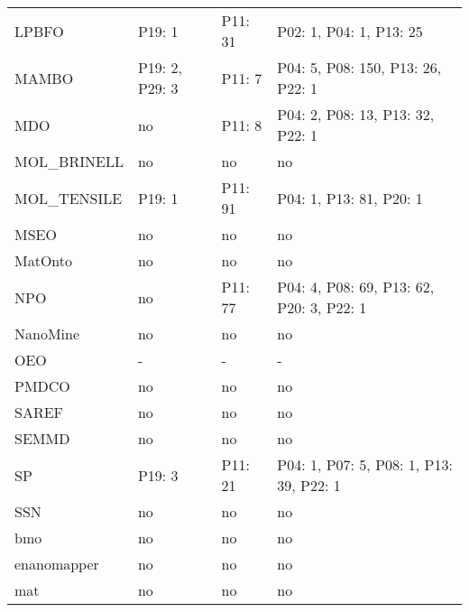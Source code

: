 \begin{tabular}{m{5cm}m{3cm}m{3cm}m{3cm}}
                  LPBFO &         P19: 1 &         P11: 31 &                  P02: 1, P04: 1, P13: 25 \\
                  MAMBO & P19: 2, P29: 3 &          P11: 7 &        P04: 5, P08: 150, P13: 26, P22: 1 \\
                    MDO &             no &          P11: 8 &         P04: 2, P08: 13, P13: 32, P22: 1 \\
            MOL_BRINELL &             no &              no &                                       no \\
            MOL_TENSILE &         P19: 1 &         P11: 91 &                  P04: 1, P13: 81, P20: 1 \\
                   MSEO &             no &              no &                                       no \\
                MatOnto &             no &              no &                                       no \\
                    NPO &             no &         P11: 77 & P04: 4, P08: 69, P13: 62, P20: 3, P22: 1 \\
               NanoMine &             no &              no &                                       no \\
                    OEO &              - &               - &                                        - \\
                  PMDCO &             no &              no &                                       no \\
                  SAREF &             no &              no &                                       no \\
                  SEMMD &             no &              no &                                       no \\
                     SP &         P19: 3 &         P11: 21 &  P04: 1, P07: 5, P08: 1, P13: 39, P22: 1 \\
                    SSN &             no &              no &                                       no \\
                    bmo &             no &              no &                                       no \\
            enanomapper &             no &              no &                                       no \\
                    mat &             no &              no &                                       no \\

\end{tabular}

